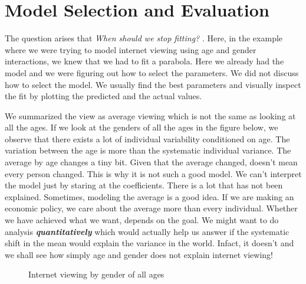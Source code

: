 \documentclass{article}
\begin{document}
\section { Model Selection and Evaluation}
The question arises that \emph{When should we stop fitting? }. Here, in the example where we were trying to model internet viewing using age and gender interactions,  we knew that we had to fit a parabola. 
Here we already had the model and we were figuring out how to select the parameters. We did not discuss how to select the model. We usually find the best parameters and visually inspect the fit by plotting the 
predicted and the actual values. 

We summarized the view as average viewing which is not the same as looking at all the ages. If we look at the genders of all the ages in the figure below, we observe that there exists a lot of individual variability 
conditioned on age. The variation between the age is more than the systematic individual variance. The average by age changes a tiny bit. Given that the average changed, doesn't mean every person changed.
This is why it is not such a good model. We can't interpret the model just by staring at the coefficients. There is a lot that has not been explained.  Sometimes, modeling the average is a good idea. If we are making an economic policy, we care about the average more than every individual. Whether we have achieved what we want, depends on the goal. We might want to do analysis \emph {\textbf{quantitatively}} which would actually help us answer if the systematic shift in the mean would explain the variance in the world. Infact, it doesn't and we shall see how simply age and gender does not explain internet viewing!
 
\begin{figure}[h]
\centering
\caption{Internet viewing by gender of all ages}
{\setlength{\fboxsep}{20pt}
\setlength{\fboxrule}{1pt}
\textcolor{Brown}{}
}
\end{figure} 
\end{document}

